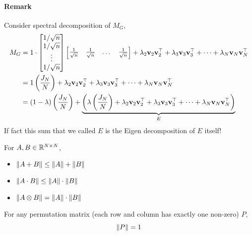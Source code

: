 \paragraph{Remark} Consider spectral decomposition of $M_G$,
\begin{align}
	M_G 
	&= 1 \cdot \begin{bmatrix}
		1/\sqrt{n} \\ 1/\sqrt{n} \\ \vdots \\ 1/\sqrt{n}
	\end{bmatrix} \begin{bmatrix}
		\frac{1}{\sqrt{n}} & \frac{1}{\sqrt{n}} & \dots & \frac{1}{\sqrt{n}}
	\end{bmatrix} + \lambda_2 \mathbf{v}_2 \mathbf{v}_2^\top + \lambda_3 \mathbf{v}_3 \mathbf{v}_3^\top + \dots + \lambda_N \mathbf{v}_N \mathbf{v}_N^\top \\
	&= 1 \left( \frac{J_N}{N} \right) + \lambda_2 \mathbf{v}_2 \mathbf{v}_2^\top + \lambda_3 \mathbf{v}_3 \mathbf{v}_3^\top + \dots + \lambda_N \mathbf{v}_N \mathbf{v}_N^\top \\
	&= (1 - \lambda) \left( \frac{J_N}{N} \right) + \underbrace{\left( \lambda \left( \frac{J_N}{N} \right) + \lambda_2 \mathbf{v}_2 \mathbf{v}_2^\top + \lambda_3 \mathbf{v}_3 \mathbf{v}_3^\top + \dots + \lambda_N \mathbf{v}_N \mathbf{v}_N^\top \right)}_{E}
\end{align}
If fact this sum that we called $E$ is the Eigen decomposition of $E$ itself! 

\begin{lemma}
\label{lemma: zig zag la 2}
	For $A, B \in \mathbb{R}^{N \times N}$,
	\begin{itemize}
		\item $\left\lVert A + B \right\rVert \leq \left\lVert A\right\rVert + \left\lVert B\right\rVert$
		\item $\left\lVert A \cdot B \right\rVert  \leq \left\lVert A\right\rVert \cdot \left\lVert B\right\rVert$
		\item $\left\lVert A \otimes B\right\rVert = \left\lVert A \right\rVert \cdot \left\lVert B\right\rVert$
	\end{itemize}
\end{lemma}

\begin{lemma}
\label{lemma: zig zag la 3}
	For any permutation matrix (each row and column has exactly one non-zero) $P$, 
	\begin{equation}
		\left\lVert P\right\rVert = 1
	\end{equation}
\end{lemma}

